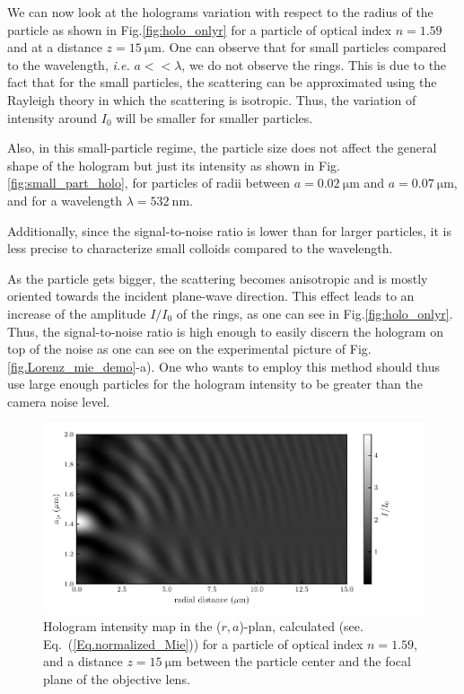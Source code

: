 We can now look at the holograms variation with respect to the radius of the particle as shown in Fig.\ref{fig:holo_onlyr} for a particle of optical index $n = 1.59$ and at a distance $z = 15 ~\mathrm{\mu m }$. One can observe that for small particles compared to the wavelength, \textit{i.e.} $a << \lambda$, we do not observe the rings. This is due to the fact that for the small particles, the scattering can be approximated using the Rayleigh theory in which the scattering is isotropic. Thus, the variation of intensity around $I_0$ will be smaller for smaller particles.

Also, in this small-particle regime, the particle size does not affect the general shape of the hologram but just its intensity as shown in Fig.\ref{fig:small_part_holo}, for particles of radii between $a = 0.02 ~\mathrm{\mu m}$ and $a = 0.07 ~\mathrm{\mu m}$, and for a wavelength $\lambda = 532 ~\mathrm{nm}$.

Additionally, since the signal-to-noise ratio is lower than for larger particles, it is less precise to characterize small colloids compared to the wavelength.


As the particle gets bigger, the scattering becomes anisotropic and is mostly oriented towards the incident plane-wave direction. This effect leads to an increase of the amplitude $I/I_0$ of the rings, as one can see in Fig.\ref{fig:holo_onlyr}. Thus, the signal-to-noise ratio is high enough to easily discern the hologram on top of the noise as one can see on the experimental picture of Fig.\ref{fig.Lorenz_mie_demo}-a). One who wants to employ this method should thus use large enough particles for the hologram intensity to be greater than the camera noise level.



\begin{figure}[H]
	\centering
	\includegraphics{02_body/chapter2/images/holo_size_exemple/holos_only_n.pdf}
	\caption{Hologram intensity map in the ($r,a$)-plan, calculated (see. Eq.~(\ref{Eq.normalized_Mie})) for a particle of optical index $n = 1.59$, and a distance $z = 15 ~\mathrm{\mu m}$ between the particle center and the focal plane of the objective lens.~\href{https://github.com/eXpensia/Confined-Brownian-Motion/blob/main/02_body/chapter2/images/holo_size_exemple/holosize_variation.ipynb}{\faGithub}}
	\label{fig:holo_onlyn}
\end{figure}


